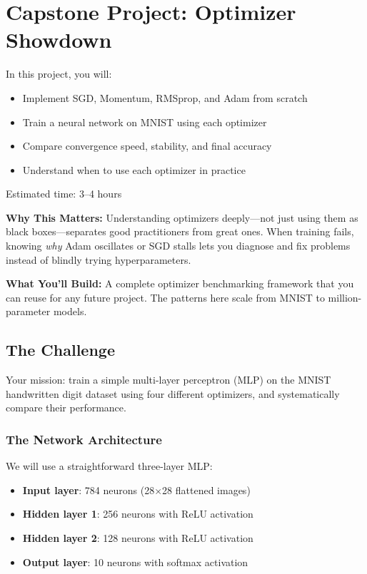 \documentclass[../../main.tex]{subfiles}
\begin{document}
\chapter{Capstone Project: Optimizer Showdown}
\label{ch:capstone-optimizers}

\begin{keytakeaways}
In this project, you will:
\begin{itemize}
    \item Implement SGD, Momentum, RMSprop, and Adam from scratch
    \item Train a neural network on MNIST using each optimizer
    \item Compare convergence speed, stability, and final accuracy
    \item Understand when to use each optimizer in practice
\end{itemize}
Estimated time: 3--4 hours
\end{keytakeaways}

\begin{realworld}
\textbf{Why This Matters:} Understanding optimizers deeply---not just using them as black boxes---separates good practitioners from great ones. When training fails, knowing \textit{why} Adam oscillates or SGD stalls lets you diagnose and fix problems instead of blindly trying hyperparameters.

\textbf{What You'll Build:} A complete optimizer benchmarking framework that you can reuse for any future project. The patterns here scale from MNIST to million-parameter models.
\end{realworld}

\section{The Challenge}
\label{sec:capstone-challenge}

Your mission: train a simple multi-layer perceptron (MLP) on the MNIST handwritten digit dataset using four different optimizers, and systematically compare their performance.

\subsection{The Network Architecture}

We will use a straightforward three-layer MLP:
\begin{itemize}
    \item \textbf{Input layer}: 784 neurons (28$\times$28 flattened images)
    \item \textbf{Hidden layer 1}: 256 neurons with ReLU activation
    \item \textbf{Hidden layer 2}: 128 neurons with ReLU activation
    \item \textbf{Output layer}: 10 neurons with softmax activation
\end{itemize}
\end{document}
